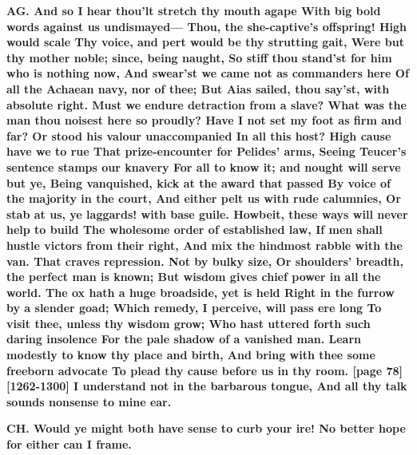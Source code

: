 \documentclass[11pt,letter]{book}
\begin{document}
\par \textbf{AG. And so I hear thou’lt stretch thy mouth agape With big bold words against us undismayed— Thou, the she-captive’s offspring! High would scale Thy voice, and pert would be thy strutting gait, Were but thy mother noble; since, being naught, So stiff thou stand’st for him who is nothing now, And swear’st we came not as commanders here Of all the Achaean navy, nor of thee; But Aias sailed, thou say’st, with absolute right. Must we endure detraction from a slave? What was the man thou noisest here so proudly? Have I not set my foot as firm and far? Or stood his valour unaccompanied In all this host? High cause have we to rue That prize-encounter for Pelides’ arms, Seeing Teucer’s sentence stamps our knavery For all to know it; and nought will serve but ye, Being vanquished, kick at the award that passed By voice of the majority in the court, And either pelt us with rude calumnies, Or stab at us, ye laggards! with base guile. Howbeit, these ways will never help to build The wholesome order of established law, If men shall hustle victors from their right, And mix the hindmost rabble with the van. That craves repression. Not by bulky size, Or shoulders’ breadth, the perfect man is known; But wisdom gives chief power in all the world. The ox hath a huge broadside, yet is held Right in the furrow by a slender goad; Which remedy, I perceive, will pass ere long To visit thee, unless thy wisdom grow; Who hast uttered forth such daring insolence For the pale shadow of a vanished man. Learn modestly to know thy place and birth, And bring with thee some freeborn advocate To plead thy cause before us in thy room. [page 78][1262-1300] I understand not in the barbarous tongue, And all thy talk sounds nonsense to mine ear.}
\par 

\par \textbf{CH. Would ye might both have sense to curb your ire! No better hope for either can I frame.}
\par 
\end{document}
